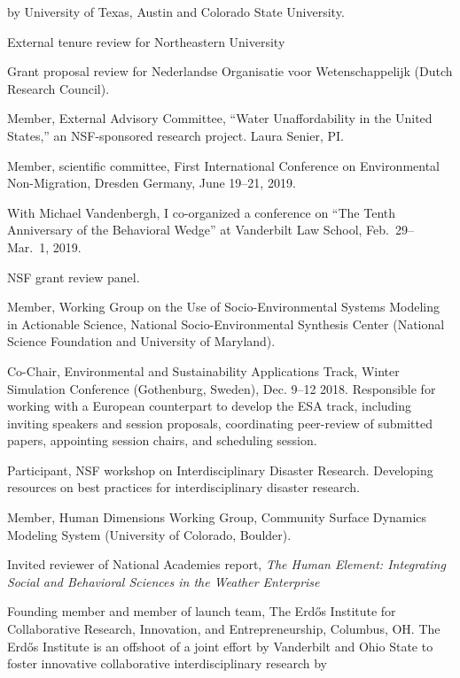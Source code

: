   by University of Texas, Austin and Colorado State University.
\item[2021] External tenure review for Northeastern University
\item[2021] Grant proposal review for Nederlandse Organisatie voor Wetenschappelijk
  (Dutch Research Council).
\item[2019--2021] Member, External Advisory Committee,
  ``Water Unaffordability in the United States,''
  an NSF-sponsored research project. Laura Senier, PI.
\item[2019] Member, scientific committee,
  First International Conference on Environmental Non-Migration,
  Dresden Germany, June 19--21, 2019.
\item[2019] With Michael Vandenbergh, I co-organized a conference on
  ``The Tenth Anniversary of the Behavioral Wedge'' at Vanderbilt Law School,
   Feb.~29--Mar.~1, 2019.
\item[2018] NSF grant review panel.
\item[2018] Member, Working Group on the Use of Socio-Environmental Systems
  Modeling in Actionable Science,
  National Socio-Environmental Synthesis Center
  (National Science Foundation and University of Maryland).
\item[2018] Co-Chair, Environmental and Sustainability Applications Track,
   Winter Simulation Conference (Gothenburg, Sweden), Dec. 9--12 2018.
   Responsible for working with a European counterpart to develop the ESA
   track, including inviting speakers and session proposals, coordinating
   peer-review of submitted papers, appointing session chairs, and scheduling
   session.
\item[2017--2018] Participant, NSF workshop on
  Interdisciplinary Disaster Research.
  Developing resources on best practices for interdisciplinary disaster
  research.
\item[2017--2018] Member, Human Dimensions Working Group,
  Community Surface Dynamics Modeling System (University of Colorado, Boulder).
\item[2017] Invited reviewer of National Academies report,
  \emph{The Human Element: Integrating Social and Behavioral Sciences in the
    Weather Enterprise}
\item[2017] Founding member and member of launch team,
  The Erd\H{o}s Institute for Collaborative Research, Innovation, and
  Entrepreneurship, Columbus, OH.
  The Erd\H{o}s Institute is an offshoot of a joint effort by Vanderbilt and
  Ohio State to foster innovative collaborative interdisciplinary research by
